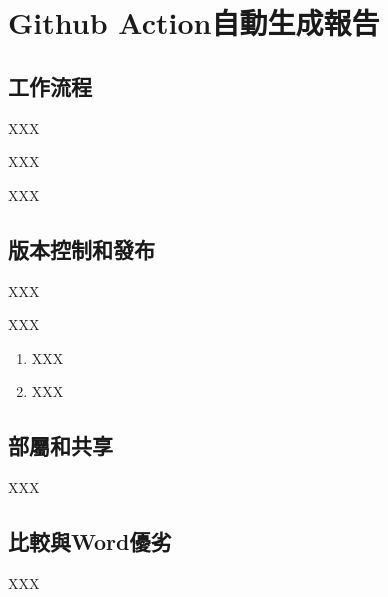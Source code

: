 \chapter{Github Action自動生成報告}
\renewcommand{\baselinestretch}{10} %
\section{工作流程}
\par
\renewcommand{\baselinestretch}{1} %
\twelve XXX\\
\par
\renewcommand{\baselinestretch}{1} %
\twelve XXX\\
\par
\renewcommand{\baselinestretch}{1} %
\twelve XXX
\par

\renewcommand{\baselinestretch}{20} %
\section{版本控制和發布}
\par
\renewcommand{\baselinestretch}{1} %
\twelve XXX\\
\par
\renewcommand{\baselinestretch}{1} %
\twelve XXX
\begin{enumerate}
	\item XXX
	\item XXX
\end{enumerate}
\par

\renewcommand{\baselinestretch}{20} %
\section{部屬和共享}
\par
\renewcommand{\baselinestretch}{1} %
\twelve XXX
\par

\renewcommand{\baselinestretch}{20} %
\section{比較與Word優劣}
\par
\renewcommand{\baselinestretch}{1} %
\twelve XXX
\par
